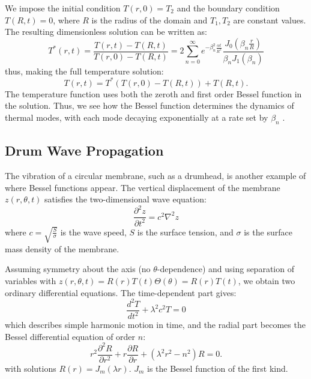 \documentclass[linenumbers, twocolumn]{aastex631}
\begin{document}
\noindent We impose the initial condition $T(r,0)=T_2$ and the boundary condition
$T(R,t)=0$, where $R$ is the radius of the domain and $T_1,T_2$ are constant
values. The resulting dimensionless solution can be written as:
\begin{equation}
    T^*(r,t)=\frac{T(r,t)-T(R,t)}{T(r,0)-T(R,t)}=2\sum_{n=0}^\infty e^{-\beta_n^2\frac{\alpha t}{R^2}}\frac{J_0(\beta_n\frac{r}{R})}{\beta_nJ_1(\beta_n)}
\end{equation}
\noindent thus, making the full temperature solution:
\begin{equation}
    T(r,t)=T^*(T(r,0)-T(R,t))+T(R,t).
\end{equation}
\noindent The temperature function uses both the zeroth and first order
Bessel function in the solution. Thus, we see how the Bessel function determines
the dynamics of thermal modes, with each mode decaying exponentially at a rate set
by $\beta_n$ \cite{neils}.\\


\subsection{Drum Wave Propagation}

The vibration of a circular membrane, such as a drumhead, is another example of
where Bessel functions appear. The vertical displacement of the membrane $z(r,\theta,t)$
satisfies the two-dimensional wave equation:
\begin{equation}
    \frac{\partial^2z}{\partial t^2}=c^2\nabla^2z
\end{equation}
\noindent where $c=\sqrt{\frac{S}{\sigma}}$ is the wave speed, $S$ is the surface
tension, and $\sigma$ is the surface mass density of the membrane. 

\noindent Assuming symmetry about the axis (no $\theta$-dependence) and using
separation of variables with $z(r,\theta,t)=R(r)T(t)\Theta(\theta)=R(r)T(t)$,
we obtain two ordinary differential equations. The time-dependent part gives:
\begin{equation}
    \frac{d^2T}{dt^2}+\lambda^2c^2T=0
\end{equation}
\noindent which describes simple harmonic motion in time, and the radial part
 becomes the Bessel differential equation of order $n$:
\begin{equation}
    r^2\frac{\partial^2R}{\partial r^2}+r\frac{\partial R}{\partial r}+(\lambda^2r^2-n^2)R=0.
\end{equation}
\noindent with solutions $R(r)=J_m(\lambda r)$. $J_m$ is the Bessel
function of the first kind.
\end{document}

